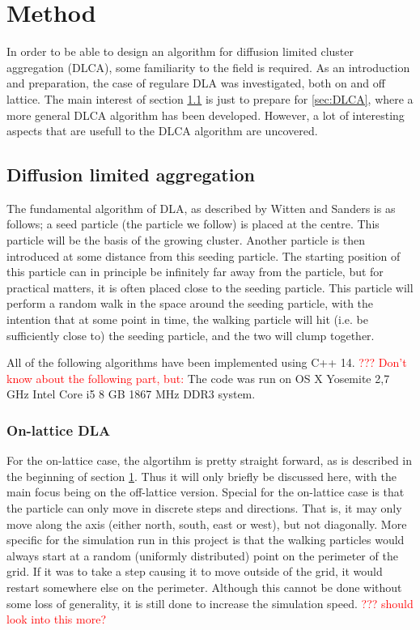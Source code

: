 \section{Method}
\label{sec:method}

In order to be able to design an algorithm for diffusion limited cluster aggregation (DLCA), some familiarity to the field is required. As an introduction and preparation, the case of regulare DLA was investigated, both on and off lattice. The main interest of section \ref{sec:DLA} is just to prepare for \ref{sec:DLCA}, where a more general DLCA algorithm has been developed. However, a lot of interesting aspects that are usefull to the DLCA algorithm are uncovered.

\subsection{Diffusion limited aggregation}
\label{sec:DLA}
The fundamental algorithm of DLA, as described by Witten and Sanders \cite{PhysRevLett.47.1400} is as follows; a seed particle (the particle we follow) is placed at the centre. This particle will be the basis of the growing cluster. Another particle is then introduced at some distance from this seeding particle. The starting position of this particle can in principle be infinitely far away from the particle, but for practical matters, it is often placed close to the seeding particle. This particle will perform a random walk in the space around the seeding particle, with the intention that at some point in time, the walking particle will hit (i.e. be sufficiently close to) the seeding particle, and the two will clump together. 

All of the following algorithms have been implemented using C++ 14. \textcolor{red}{??? Don't know about the following part, but:} The code was run on OS X Yosemite 2,7 GHz Intel Core i5 8 GB 1867 MHz DDR3 system.

\subsubsection{On-lattice DLA}
\label{sec:on-lattice_method}
For the on-lattice case, the algortihm is pretty straight forward, as is described in the beginning of section \ref{sec:method}. Thus it will only briefly be discussed here, with the main focus being on the off-lattice version. Special for the on-lattice case is that the particle can only move in discrete steps and directions. That is, it may only move along the axis (either north, south, east or west), but not diagonally. More specific for the simulation run in this project is that the walking particles would always start at a random (uniformly distributed) point on the perimeter of the grid. If it was to take a step causing it to move outside of the grid, it would restart somewhere else on the perimeter. Although this cannot be done without some loss of generality, it is still done to increase the simulation speed. \textcolor{red}{??? should look into this more?}


